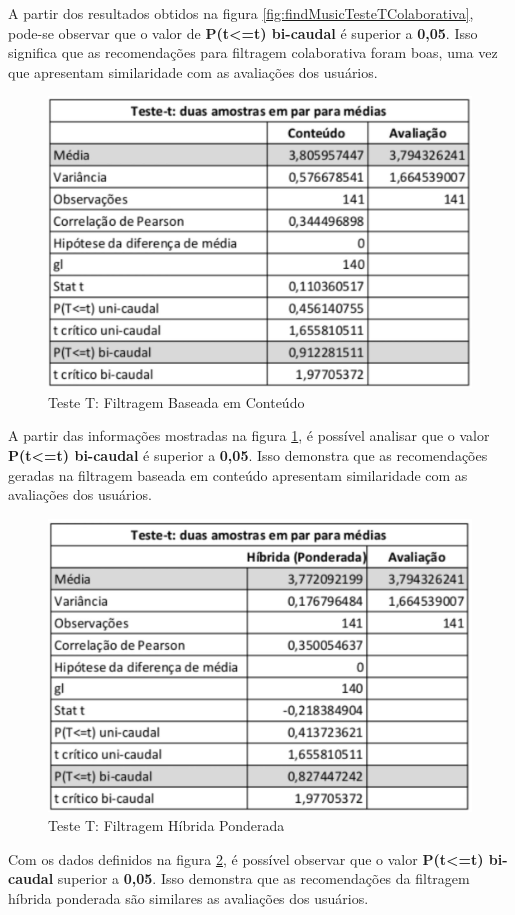 A partir dos resultados obtidos na figura \ref{fig:findMusicTesteTColaborativa}, pode-se observar que o valor de \textbf{P(t<=t) bi-caudal} é superior a \textbf{0,05}. Isso significa que as recomendações para filtragem colaborativa foram boas, uma vez que apresentam similaridade com as avaliações dos usuários.

\begin{figure}[H]
	\centering
	\includegraphics[width=.6\linewidth]{imagens/findmusicTesteTConteudo.jpg}
	\caption[Teste T: Filtragem Baseada em Conteúdo]{Teste T: Filtragem Baseada em Conteúdo}
    \label{fig:findMusicTesteTConteudo}
\end{figure}

A partir das informações mostradas na figura \ref{fig:findMusicTesteTConteudo}, é possível analisar que o valor \textbf{P(t<=t) bi-caudal} é superior a \textbf{0,05}. Isso demonstra que as recomendações geradas na filtragem baseada em conteúdo apresentam similaridade com as avaliações dos usuários.

\begin{figure}[H]
	\centering
	\includegraphics[width=.6\linewidth]{imagens/findmusicTesteTPonderado.jpg}
	\caption[Teste T: Filtragem Híbrida Ponderada]{Teste T: Filtragem Híbrida Ponderada}
    \label{fig:findMusicTesteTPonderado}
\end{figure}

Com os dados definidos na figura \ref{fig:findMusicTesteTPonderado}, é possível observar que o valor \textbf{P(t<=t) bi-caudal} superior a \textbf{0,05}. Isso demonstra que as recomendações da filtragem híbrida ponderada são similares as avaliações dos usuários.

